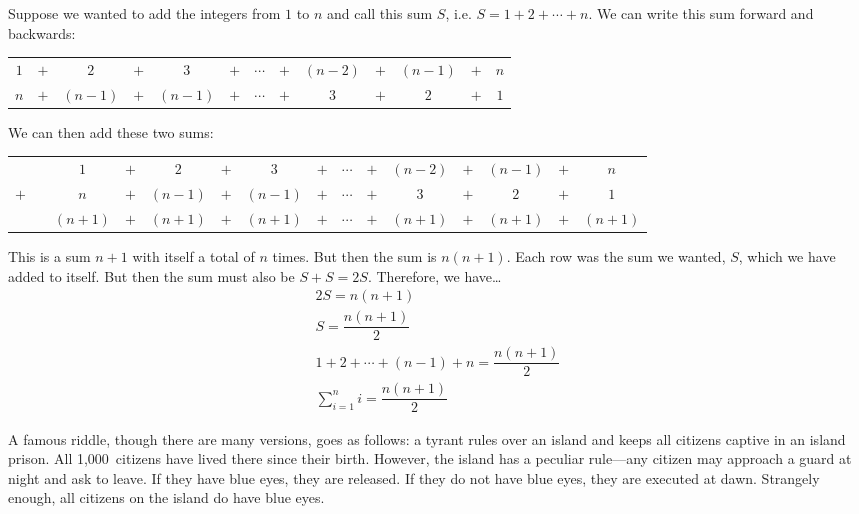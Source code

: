\documentclass[11pt,letterpaper]{article}
\begin{document}
\sol Suppose we wanted to add the integers from $1$ to $n$ and call this sum $S$, i.e. $S= 1 + 2 + \cdots + n$. We can write this sum forward and backwards: \par
	\begin{table}[ht]
	\centering
	\begin{tabular}{ccccccccccccc}
	$1$ & $+$ & $2$ & $+$ & $3$ & $+$ & $\cdots$ & $+$ & $(n - 2)$ & $+$ & $(n - 1)$ & $+$ & $n$ \\
	$n$ & $+$ & $(n - 1)$ & $+$ & $(n - 1)$ & $+$ & $\cdots$ & $+$ & $3$ & $+$ & $2$ & $+$ & $1$
	\end{tabular}
	\end{table} \par
We can then add these two sums: \par
	\begin{table}[ht]
	\centering
	\begin{tabular}{ccccccccccccccc}
	 & & $1$ & $+$ & $2$ & $+$ & $3$ & $+$ & $\cdots$ & $+$ & $(n - 2)$ & $+$ & $(n - 1)$ & $+$ & $n$ \\
	$+$ & & $n$ & $+$ & $(n - 1)$ & $+$ & $(n - 1)$ & $+$ & $\cdots$ & $+$ & $3$ & $+$ & $2$ & $+$ & $1$ \\ \cline{3-15}
	& & $(n + 1)$ & $+$ & $(n + 1)$ & $+$ & $(n + 1)$ & $+$ & $\cdots$ & $+$ & $(n + 1)$ & $+$ & $(n + 1)$ & $+$ & $(n + 1)$
	\end{tabular}
	\end{table} \par
This is a sum $n + 1$ with itself a total of $n$ times. But then the sum is $n(n + 1)$. Each row was the sum we wanted, $S$, which we have added to itself. But then the sum must also be $S + S= 2S$. Therefore, we have\dots
	\[
	\begin{gathered}
	2S= n(n + 1) \\[0.3cm]
	S= \dfrac{n(n + 1)}{2} \\[0.3cm]
	1 + 2 + \cdots + (n - 1) + n= \dfrac{n(n + 1)}{2} \\[0.3cm]
	\sum_{i=1}^n i = \dfrac{n(n + 1)}{2}
	\end{gathered}
	\]



\newpage



 A famous riddle, though there are many versions, goes as follows: a tyrant rules over an island and keeps all citizens captive in an island prison. All 1,000~citizens have lived there since their birth. However, the island has a peculiar rule---any citizen may approach a guard at night and ask to leave. If they have blue eyes, they are released. If they do not have blue eyes, they are executed at dawn. Strangely enough, all citizens on the island do have blue eyes. 
\end{document}
